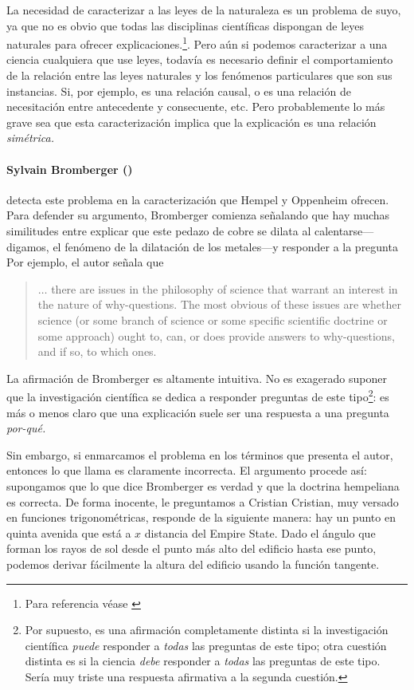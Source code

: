 La necesidad de caracterizar a las leyes de la naturaleza es
un problema de suyo, ya que no es obvio que todas las
disciplinas científicas  dispongan de leyes naturales para
ofrecer explicaciones.\footnote{
Para referencia véase \parencite{dieguez2012}}. 
Pero aún si podemos
caracterizar a una ciencia cualquiera que use leyes, todavía es
necesario definir el comportamiento de la
relación entre las leyes naturales y los
fenómenos particulares que son sus instancias. Si, por
ejemplo, es una relación causal, o es una relación de
necesitación entre antecedente y consecuente, etc. Pero
probablemente lo más grave sea que esta
caracterización implica que la explicación es una relación
\emph{simétrica.}


\paragraph{Sylvain Bromberger (\citeyear{Bromberger1966})}
detecta este problema en la caracterización que Hempel y
Oppenheim ofrecen. Para defender su argumento, Bromberger
comienza señalando que hay muchas similitudes entre explicar
que este pedazo de cobre se dilata al calentarse---digamos, 
el fenómeno de la dilatación de los metales---y responder a
la pregunta  Por ejemplo, el autor señala que

	\begin{quote}
    $ \ldots $ there are issues in the philosophy of science
    that warrant an interest in the nature of why-questions.
    The most obvious of these issues are whether science (or
    some branch of science or some specific scientific
    doctrine or some approach) ought to, can, or does
    provide answers to why-questions, and if so, to which
    ones.
	\end{quote}

La afirmación de Bromberger es altamente intuitiva. No
es exagerado suponer que la investigación científica
se dedica a responder preguntas de este tipo\footnote{
  Por supuesto, es una afirmación	completamente distinta si
  la	investigación científica \emph{puede} responder a
  \emph{todas} las preguntas de este tipo; otra cuestión
  distinta es si la	ciencia \emph{debe} responder a
  \emph{todas} las preguntas de este tipo. Sería muy triste
  una respuesta afirmativa a la segunda cuestión.
}:
es más o menos claro que una explicación suele ser una
respuesta a una pregunta \emph{por-qué.}

Sin embargo, si  enmarcamos el problema en los términos que
presenta el autor, entonces lo que llama  es claramente incorrecta. El argumento procede
así: supongamos que lo que dice Bromberger es verdad y que
la doctrina hempeliana es correcta. De forma inocente, le
preguntamos a Cristian  Cristian, muy versado en
funciones trigonométricas, responde de la siguiente manera:
hay un punto en quinta  avenida que está a $ x $ distancia
del Empire State. Dado el ángulo que forman los rayos de sol
desde el punto más alto del edificio hasta ese punto,
podemos derivar fácilmente la altura del edificio usando la
función tangente.

